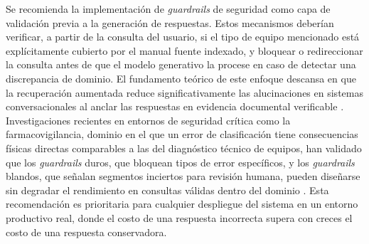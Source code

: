 {Se recomienda la implementación de \textit{guardrails} de seguridad como capa de validación previa a la generación de respuestas. Estos mecanismos deberían verificar, a partir de la consulta del usuario, si el tipo de equipo mencionado está explícitamente cubierto por el manual fuente indexado, y bloquear o redireccionar la consulta antes de que el modelo generativo la procese en caso de detectar una discrepancia de dominio. El fundamento teórico de este enfoque descansa en que la recuperación aumentada reduce significativamente las alucinaciones en sistemas conversacionales al anclar las respuestas en evidencia documental verificable \parencite{shuster2021retrieval}. Investigaciones recientes en entornos de seguridad crítica como la farmacovigilancia, dominio en el que un error de clasificación tiene consecuencias físicas directas comparables a las del diagnóstico técnico de equipos, han validado que los \textit{guardrails} duros, que bloquean tipos de error específicos, y los \textit{guardrails} blandos, que señalan segmentos inciertos para revisión humana, pueden diseñarse sin degradar el rendimiento en consultas válidas dentro del dominio \parencite{hakim2025guardrails}. Esta recomendación es prioritaria para cualquier despliegue del sistema en un entorno productivo real, donde el costo de una respuesta incorrecta supera con creces el costo de una respuesta conservadora.

}{}


\newcommand{\mostrarglosario}{false}


